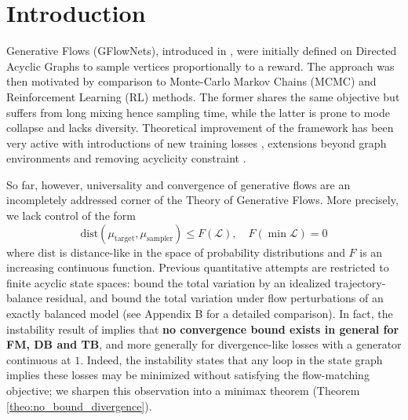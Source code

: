 
\section{Introduction}

Generative Flows (GFlowNets), introduced in \citet{bengio2021flow, bengio2023gflownet}, were initially defined on Directed Acyclic Graphs to sample vertices proportionally to a reward.
The approach was then motivated by comparison to Monte-Carlo Markov Chains (MCMC) and Reinforcement Learning (RL) methods.
The former shares the same objective but suffers from long mixing hence sampling time, while the latter is prone to mode collapse and lacks diversity.
Theoretical improvement of the framework has been very active with introductions of new training losses \cite{malkin2022trajectory,pan2023better,brunswic2024theory, silva2024divergence,hu2024beyond},
extensions beyond graph environments \cite{li2023cflownets, lahlou2023theory} and removing acyclicity constraint \cite{brunswic2024theory,morozov2025revisiting}.

So far, however, universality and convergence of generative flows are an incompletely addressed corner of the Theory of Generative Flows. More precisely, we lack control of the form
\begin{equation}
    \mathrm{dist}(\mu_{\mathrm{target}}, \mu_{\mathrm{sampler}}) \leq F(\mathcal L), \quad F(\min \mathcal L)=0
\end{equation}
where $\mathrm{dist}$ is distance-like in the space of probability distributions and $F$ is an increasing continuous function.
Previous quantitative attempts are restricted to finite acyclic state spaces: \citet{silvageneralization} bound the total variation by an idealized trajectory-balance residual, and \citet{silva2025gflownets} bound the total variation under flow perturbations of an exactly balanced model (see Appendix B for a detailed comparison).
In fact, the instability result of \citet{brunswic2024theory}  implies that \textbf{no convergence bound exists in general for FM, DB and TB}, and more generally for divergence-like losses with a generator continuous at $1$.
Indeed, the instability states that any loop in the state graph implies these losses may be minimized without satisfying the flow-matching objective; we sharpen this observation into a minimax theorem (Theorem \ref{theo:no_bound_divergence}).

